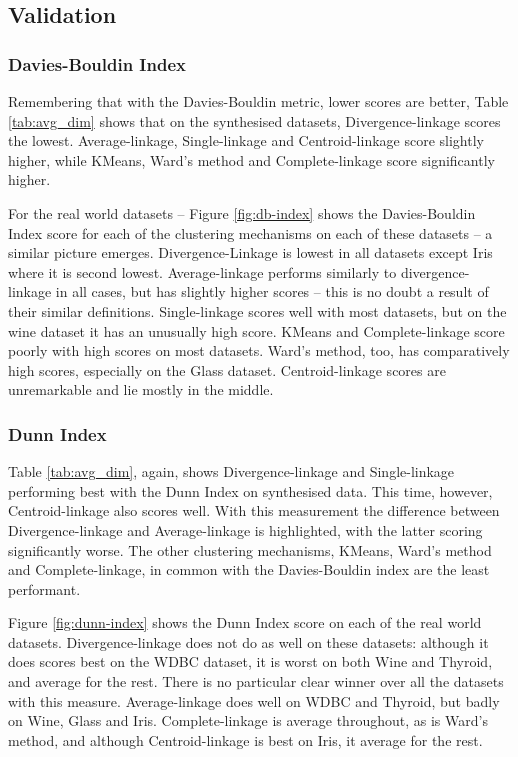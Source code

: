 \subsection{Validation}
\subsubsection{Davies-Bouldin Index}
Remembering that with the Davies-Bouldin metric, lower scores are better, Table \ref{tab:avg_dim} shows that on the synthesised datasets, Divergence-linkage scores the lowest.  Average-linkage, Single-linkage and Centroid-linkage score slightly higher, while  KMeans, Ward's method and Complete-linkage score significantly higher.

For the real world datasets -- Figure \ref{fig:db-index} shows the Davies-Bouldin Index score for each of the clustering mechanisms on each of these datasets -- a similar picture emerges.  Divergence-Linkage is lowest in all datasets except Iris where it is second lowest.  Average-linkage performs similarly to divergence-linkage in all cases, but has slightly higher scores -- this is no doubt a result of their similar definitions.  Single-linkage scores well with most datasets, but on the wine dataset it has an unusually high score.  KMeans and Complete-linkage score poorly with high scores on most datasets. Ward's method, too, has comparatively high scores, especially on the Glass dataset.  Centroid-linkage scores are unremarkable and lie mostly in the middle.
\subsubsection{Dunn Index}
Table \ref{tab:avg_dim}, again, shows Divergence-linkage and Single-linkage performing best with the Dunn Index on synthesised data.  This time, however, Centroid-linkage also scores well.  With this measurement the difference between Divergence-linkage and Average-linkage is highlighted, with the latter scoring significantly worse.  The other clustering mechanisms, KMeans, Ward's method and Complete-linkage, in common with the Davies-Bouldin index are the least performant.  

Figure \ref{fig:dunn-index} shows the Dunn Index score on each of the real world datasets.  Divergence-linkage does not do as well on these datasets: although it does scores best on the WDBC dataset, it is worst on both Wine and Thyroid, and average for the rest.  There is no particular clear winner over all the datasets with this measure.  Average-linkage does well on WDBC and Thyroid, but badly on Wine, Glass and Iris.  Complete-linkage is average throughout, as is Ward's method, and although Centroid-linkage is best on Iris, it average for the rest.

